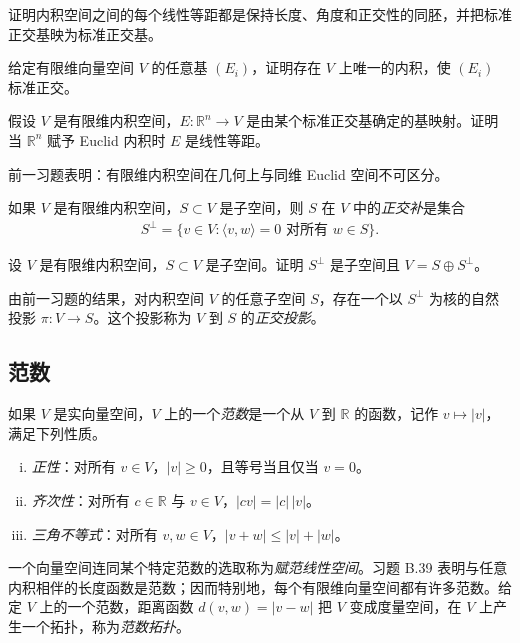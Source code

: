 \documentclass[../../main.tex]{subfiles}
\begin{document}
\begin{exercise}\label{exercise:appB-B-42}
证明内积空间之间的每个线性等距都是保持长度、角度和正交性的同胚，并把标准正交基映为标准正交基。
\end{exercise}

\begin{exercise}\label{exercise:appB-B-43}
给定有限维向量空间 $V$ 的任意基 $(E_i)$，证明存在 $V$ 上唯一的内积，使 $(E_i)$ 标准正交。
\end{exercise}

\begin{exercise}\label{exercise:appB-B-44}
假设 $V$ 是有限维内积空间，$E:\mathbb R^n\to V$ 是由某个标准正交基确定的基映射。证明当 $\mathbb R^n$ 赋予 Euclid 内积时 $E$ 是线性等距。
\end{exercise}

前一习题表明：有限维内积空间在几何上与同维 Euclid 空间不可区分。

如果 $V$ 是有限维内积空间，$S\subset V$ 是子空间，则 $S$ 在 $V$ 中的\emph{正交补}是集合
\begin{align*}
S^\perp=\{v\in V:\langle v,w\rangle=0\text{ 对所有 }w\in S\}.
\end{align*}

\begin{exercise}\label{exercise:appB-B-45}
设 $V$ 是有限维内积空间，$S\subset V$ 是子空间。证明 $S^\perp$ 是子空间且 $V=S\oplus S^\perp$。
\end{exercise}

由前一习题的结果，对内积空间 $V$ 的任意子空间 $S$，存在一个以 $S^\perp$ 为核的自然投影 $\pi:V\to S$。这个投影称为 $V$ 到 $S$ 的\emph{正交投影}。

\subsection*{范数}

如果 $V$ 是实向量空间，$V$ 上的一个\emph{范数}是一个从 $V$ 到 $\mathbb R$ 的函数，记作 $v\mapsto|v|$，满足下列性质。
\begin{enumerate}[(i)]
\item \emph{正性}：对所有 $v\in V$，$|v|\geqslant0$，且等号当且仅当 $v=0$。
\item \emph{齐次性}：对所有 $c\in\mathbb R$ 与 $v\in V$，$|cv|=|c|\,|v|$。
\item \emph{三角不等式}：对所有 $v,w\in V$，$|v+w|\leqslant|v|+|w|$。
\end{enumerate}

一个向量空间连同某个特定范数的选取称为\emph{赋范线性空间}。习题 B.39 表明与任意内积相伴的长度函数是范数；因而特别地，每个有限维向量空间都有许多范数。给定 $V$ 上的一个范数，距离函数 $d(v,w)=|v-w|$ 把 $V$ 变成度量空间，在 $V$ 上产生一个拓扑，称为\emph{范数拓扑}。
\end{document}
